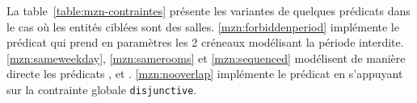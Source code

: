 


La table~\ref{table:mzn-contraintes} présente les variantes de quelques prédicats \UTP{} dans le cas où les entités ciblées sont des salles.
\ref{mzn:forbiddenperiod} implémente le prédicat \texttt{\FORBIDDENPERIOD} qui prend en paramètres les 2 créneaux modélisant la période interdite. 
\ref{mzn:sameweekday}, \ref{mzn:samerooms} et \ref{mzn:sequenced} modélisent de manière directe les prédicats \texttt{\SAMEWEEKDAY}, \texttt{\SAMEROOMS} et \texttt{\SEQUENCED}.
\ref{mzn:nooverlap} implémente le prédicat \texttt{\NOOVERLAP} en s'appuyant sur la contrainte globale \texttt{disjunctive}. %



